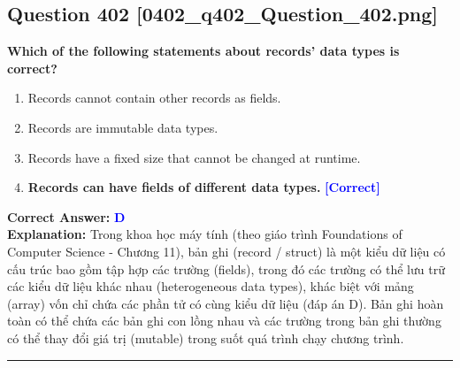\documentclass[11pt,a4paper]{article}
\begin{document}
\begin{minipage}{\textwidth}
\subsection*{Question 402 \quad \footnotesize{[0402\_q402\_Question\_402.png]}}
\noindent \textbf{Which of the following statements about records' data types is correct?}

\begin{enumerate}[label=\Alph*.]
    \item Records cannot contain other records as fields.
    \item Records are immutable data types.
    \item Records have a fixed size that cannot be changed at runtime.
    \item \textbf{Records can have fields of different data types.} \hfill \textcolor{blue}{\textbf{[Correct]}}
\end{enumerate}

\noindent \textbf{Correct Answer:} \textcolor{blue}{\textbf{D}} \\[2pt]
\noindent \textbf{Explanation:} Trong khoa học máy tính (theo giáo trình Foundations of Computer Science - Chương 11), bản ghi (record / struct) là một kiểu dữ liệu có cấu trúc bao gồm tập hợp các trường (fields), trong đó các trường có thể lưu trữ các kiểu dữ liệu khác nhau (heterogeneous data types), khác biệt với mảng (array) vốn chỉ chứa các phần tử có cùng kiểu dữ liệu (đáp án D). Bản ghi hoàn toàn có thể chứa các bản ghi con lồng nhau và các trường trong bản ghi thường có thể thay đổi giá trị (mutable) trong suốt quá trình chạy chương trình.

\par\vspace{0.3cm}
\hrule
\vspace{0.3cm}
\end{minipage}
\end{document}
